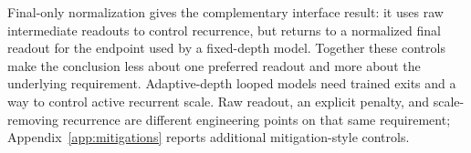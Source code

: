 Final-only normalization gives the complementary interface result: it uses raw intermediate readouts to control recurrence, but returns to a normalized final readout for the endpoint used by a fixed-depth model.
Together these controls make the conclusion less about one preferred readout and more about the underlying requirement.
Adaptive-depth looped models need trained exits and a way to control active recurrent scale.
Raw readout, an explicit penalty, and scale-removing recurrence are different engineering points on that same requirement; Appendix~\ref{app:mitigations} reports additional mitigation-style controls.
